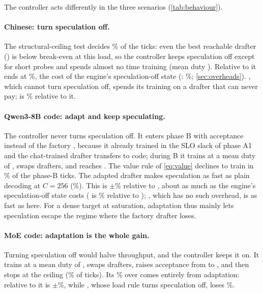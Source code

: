 The controller acts differently in the three scenarios (\cref{tab:behaviour}).

\paragraph{Chinese: turn speculation off.} The structural-ceiling test decides \% of the ticks: even the best reachable drafter () is below break-even at this load, so the controller keeps speculation off except for short probes and spends almost no time training (mean duty ). Relative to  it ends at \%, the cost of the engine's speculation-off state (: \%; \cref{sec:overheads}). , which cannot turn speculation off, spends its training on a drafter that can never pay;  is \% relative to it.

\paragraph{Qwen3-8B code: adapt and keep speculating.} The controller never turns speculation off. It enters phase B with acceptance  instead of the factory , because it already trained in the SLO slack of phase A1 and the chat-trained drafter transfers to code; during B it trains at a mean duty of , swaps  drafters, and reaches . The value rule of \cref{eq:value} declines to train in \% of the phase-B ticks. The adapted drafter makes speculation as fast as plain decoding at $C{=}256$ (\%). This is $\pm$\% relative to , about as much as the engine's speculation-off state costs ( is \% relative to ); , which has no such overhead, is as fast as  here. For a dense target at saturation, adaptation thus mainly lets speculation escape the regime where the factory drafter loses.

\paragraph{MoE code: adaptation is the whole gain.} Turning speculation off would halve throughput, and the controller keeps it on. It trains at a mean duty of , swaps  drafters, raises acceptance from  to , and then stops at the ceiling (\% of ticks). Its \% over  comes entirely from adaptation: relative to  it is $\pm$\%, while , whose load rule turns speculation off, loses \%.

